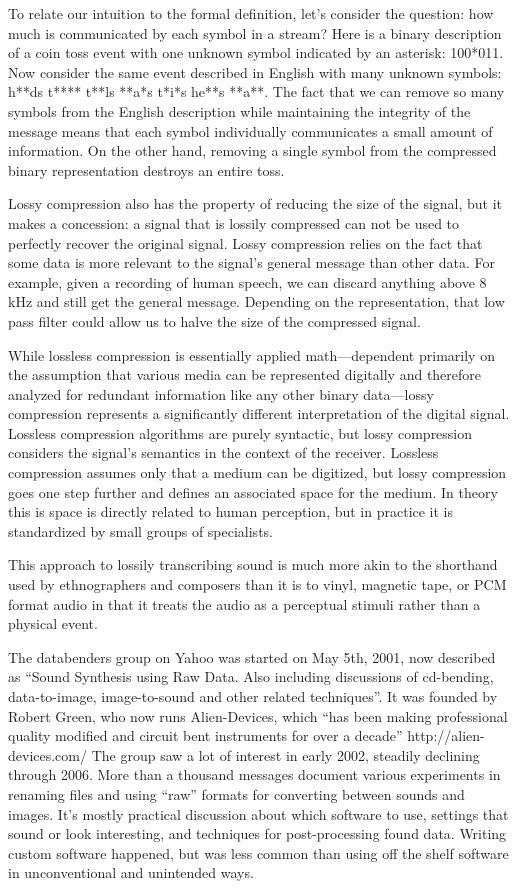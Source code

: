 \documentclass{thesis}
\begin{document}
	To relate our intuition to the formal definition, let's consider the question: how much is communicated by each symbol in a stream? Here is a binary description of a coin toss event with one unknown symbol indicated by an asterisk: 100*011. Now consider the same event described in English with many unknown symbols: h**ds t**** t**ls **a*s t*i*s he**s **a**. The fact that we can remove so many symbols from the English description while maintaining the integrity of the message means that each symbol individually communicates a small amount of information. On the other hand, removing a single symbol from the compressed binary representation destroys an entire toss.
	
	Lossy compression also has the property of reducing the size of the signal, but it makes a concession: a signal that is lossily compressed can not be used to perfectly recover the original signal. Lossy compression relies on the fact that some data is more relevant to the signal's general message than other data. For example, given a recording of human speech, we can discard anything above 8 kHz and still get the general message. Depending on the representation, that low pass filter could allow us to halve the size of the compressed signal.
	
	While lossless compression is essentially applied math---dependent primarily on the assumption that various media can be represented digitally and therefore analyzed for redundant information like any other binary data---lossy compression represents a significantly different interpretation of the digital signal. Lossless compression algorithms are purely syntactic, but lossy compression considers the signal's semantics in the context of the receiver. Lossless compression assumes only that a medium can be digitized, but lossy compression goes one step further and defines an associated space for the medium. In theory this is space is directly related to human perception, but in practice it is standardized by small groups of specialists.
	
	This approach to lossily transcribing sound is much more akin to the shorthand used by ethnographers and composers than it is to vinyl, magnetic tape, or PCM format audio in that it treats the audio as a perceptual stimuli rather than a physical event.
	
	The databenders group on Yahoo\cite{indianropeburn_databenders_????} was started on May 5th, 2001, now described as ``Sound Synthesis using Raw Data. Also including discussions of cd-bending, data-to-image, image-to-sound and other related techniques''. It was founded by Robert Green, who now runs Alien-Devices, which ``has been making professional quality modified and circuit bent instruments for over a decade'' http://alien-devices.com/ The group saw a lot of interest in early 2002, steadily declining through 2006. More than a thousand messages document various experiments in renaming files and using ``raw'' formats for converting between sounds and images. It's mostly practical discussion about which software to use, settings that sound or look interesting, and techniques for post-processing found data. Writing custom software happened, but was less common than using off the shelf software in unconventional and unintended ways.
	
\end{document}
